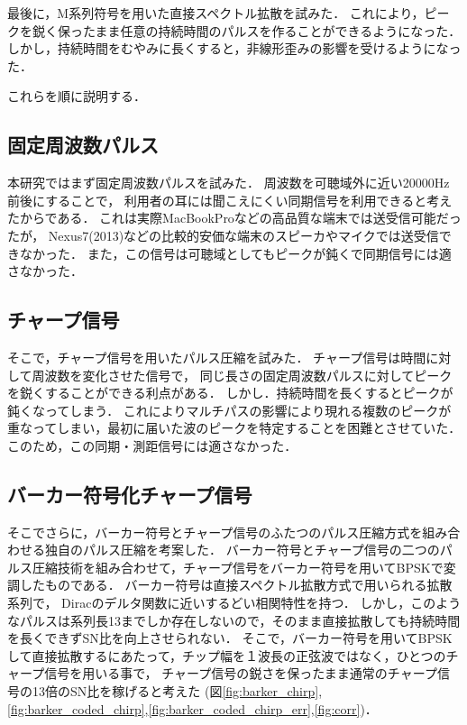 最後に，M系列符号を用いた直接スペクトル拡散を試みた．
これにより，ピークを鋭く保ったまま任意の持続時間のパルスを作ることができるようになった．
しかし，持続時間をむやみに長くすると，非線形歪みの影響を受けるようになった．

これらを順に説明する．

\subsection{固定周波数パルス}

本研究ではまず固定周波数パルスを試みた．
周波数を可聴域外に近い20000Hz前後にすることで，
利用者の耳には聞こえにくい同期信号を利用できると考えたからである．
これは実際MacBookProなどの高品質な端末では送受信可能だったが，
Nexus7(2013)などの比較的安価な端末のスピーカやマイクでは送受信できなかった．
また，この信号は可聴域としてもピークが鈍くで同期信号には適さなかった．

\subsection{チャープ信号}

そこで，チャープ信号を用いたパルス圧縮を試みた．
チャープ信号は時間に対して周波数を変化させた信号で，
同じ長さの固定周波数パルスに対してピークを鋭くすることができる利点がある．
しかし．持続時間を長くするとピークが鈍くなってしまう．
これによりマルチパスの影響により現れる複数のピークが重なってしまい，最初に届いた波のピークを特定することを困難とさせていた．
このため，この同期・測距信号には適さなかった．

\subsection{バーカー符号化チャープ信号}

そこでさらに，バーカー符号とチャープ信号のふたつのパルス圧縮方式を組み合わせる独自のパルス圧縮を考案した\cite{self_ac}．
バーカー符号とチャープ信号の二つのパルス圧縮技術を組み合わせて，チャープ信号をバーカー符号を用いてBPSKで変調したものである．
バーカー符号は直接スペクトル拡散方式で用いられる拡散系列で，
Diracのデルタ関数に近いするどい相関特性を持つ．
しかし，このようなパルスは系列長13までしか存在しないので，そのまま直接拡散しても持続時間を長くできずSN比を向上させられない．
そこで，バーカー符号を用いてBPSKして直接拡散するにあたって，チップ幅を１波長の正弦波ではなく，ひとつのチャープ信号を用いる事で，
チャープ信号の鋭さを保ったまま通常のチャープ信号の13倍のSN比を稼げると考えた
(図\ref{fig:barker_chirp},\ref{fig:barker_coded_chirp},\ref{fig:barker_coded_chirp_err},\ref{fig:corr})．

